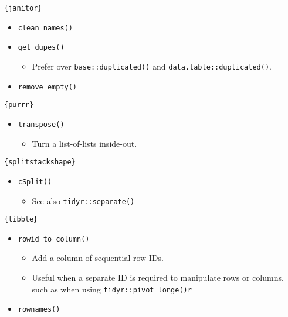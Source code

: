 \documentclass[
]{book}
\providecommand{\tightlist}{%
  \setlength{\itemsep}{0pt}\setlength{\parskip}{0pt}}
\begin{document}
\texttt{\{janitor\}}

\begin{itemize}
\tightlist
\item
  \texttt{clean\_names()}
\item
  \texttt{get\_dupes()}

  \begin{itemize}
  \tightlist
  \item
    Prefer over \texttt{base::duplicated()} and \texttt{data.table::duplicated()}.
  \end{itemize}
\item
  \texttt{remove\_empty()}
\end{itemize}

\texttt{\{purrr\}}

\begin{itemize}
\tightlist
\item
  \texttt{transpose()}

  \begin{itemize}
  \tightlist
  \item
    Turn a list-of-lists inside-out.
  \end{itemize}
\end{itemize}

\texttt{\{splitstackshape\}}

\begin{itemize}
\tightlist
\item
  \texttt{cSplit()}

  \begin{itemize}
  \tightlist
  \item
    See also \texttt{tidyr::separate()}
  \end{itemize}
\end{itemize}

\texttt{\{tibble\}}

\begin{itemize}
\tightlist
\item
  \texttt{rowid\_to\_column()}

  \begin{itemize}
  \tightlist
  \item
    Add a column of sequential row IDs.
  \item
    Useful when a separate ID is required to manipulate rows or columns, such as when using \texttt{tidyr::pivot\_longe()r}
  \end{itemize}
\item
  \texttt{rownames()}
\end{itemize}
\end{document}
